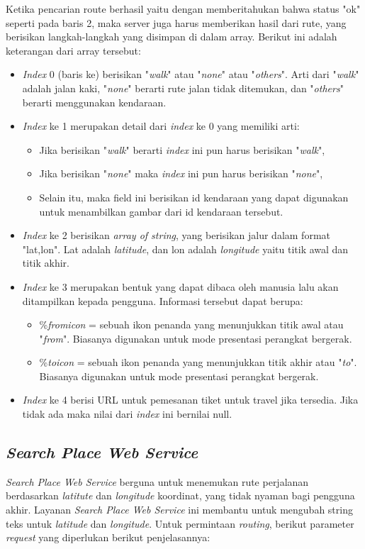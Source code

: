 Ketika pencarian route berhasil yaitu dengan memberitahukan bahwa status "ok" seperti pada baris 2, maka server juga harus memberikan hasil dari rute, yang berisikan langkah-langkah yang disimpan di dalam array. Berikut ini adalah keterangan dari array tersebut:

\begin{itemize}
	\item \textit{Index} 0 (baris ke) berisikan "\textit{walk}" atau "\textit{none}" atau "\textit{others}". Arti dari "\textit{walk}" adalah jalan kaki, "\textit{none}" berarti rute jalan tidak ditemukan, dan "\textit{others}" berarti menggunakan kendaraan.
	\item \textit{Index} ke 1 merupakan detail dari \textit{index} ke 0 yang memiliki arti:
	\begin{itemize}
		\item Jika berisikan "\textit{walk}" berarti \textit{index} ini pun harus berisikan "\textit{walk}",
		\item Jika berisikan "\textit{none}" maka \textit{index} ini pun harus berisikan "\textit{none}",
		\item Selain itu, maka field ini berisikan id kendaraan yang dapat digunakan untuk menambilkan gambar dari id kendaraan tersebut.
	\end{itemize}
	\item \textit{Index} ke 2 berisikan \textit{array of string}, yang berisikan jalur dalam format "lat,lon". Lat adalah \textit{latitude}, dan lon adalah \textit{longitude} yaitu titik awal dan titik akhir.
	\item \textit{Index} ke 3 merupakan bentuk yang dapat dibaca oleh manusia lalu akan ditampilkan kepada pengguna. Informasi tersebut dapat berupa:
	\begin{itemize}
		\item \%\textit{fromicon} = sebuah ikon penanda yang menunjukkan titik awal atau "\textit{from}". Biasanya digunakan untuk mode presentasi perangkat bergerak.
		\item \%\textit{toicon} = sebuah ikon penanda yang menunjukkan titik akhir atau "\textit{to}". Biasanya digunakan untuk mode presentasi perangkat bergerak.
	\end{itemize}
	\item \textit{Index} ke 4 berisi URL untuk pemesanan tiket untuk travel jika tersedia. Jika tidak ada maka nilai dari \textit{index} ini bernilai null.
\end{itemize}


\subsection{\textit{Search Place Web Service}}
\textit{Search Place Web Service} berguna untuk menemukan rute perjalanan berdasarkan \textit{latitute} dan \textit{longitude} koordinat, yang tidak nyaman bagi pengguna akhir. Layanan \textit{Search Place Web Service} ini membantu untuk mengubah string teks untuk \textit{latitude} dan \textit{longitude}. Untuk permintaan \textit{routing}, berikut parameter \textit{request} yang diperlukan berikut penjelasannya:

